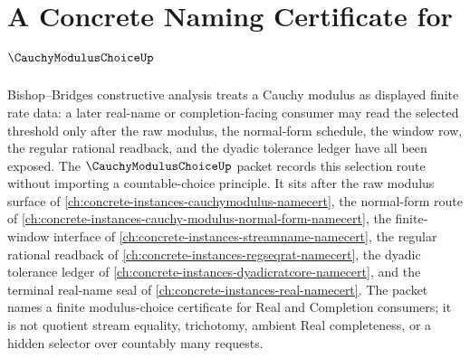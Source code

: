 \chapter{A Concrete Naming Certificate for $\CauchyModulusChoiceUp$}
\label{ch:concrete-instances-cauchy-modulus-choice-namecert}

Bishop--Bridges constructive analysis treats a Cauchy modulus as displayed finite rate data: a later real-name or completion-facing consumer may read the selected threshold only after the raw modulus, the normal-form schedule, the window row, the regular rational readback, and the dyadic tolerance ledger have all been exposed. The $\CauchyModulusChoiceUp$ packet records this selection route without importing a countable-choice principle. It sits after the raw modulus surface of \autoref{ch:concrete-instances-cauchymodulus-namecert}, the normal-form route of \autoref{ch:concrete-instances-cauchy-modulus-normal-form-namecert}, the finite-window interface of \autoref{ch:concrete-instances-streamname-namecert}, the regular rational readback of \autoref{ch:concrete-instances-regseqrat-namecert}, the dyadic tolerance ledger of \autoref{ch:concrete-instances-dyadicratcore-namecert}, and the terminal real-name seal of \autoref{ch:concrete-instances-real-namecert}. The packet names a finite modulus-choice certificate for Real and Completion consumers; it is not quotient stream equality, trichotomy, ambient Real completeness, or a hidden selector over countably many requests.

